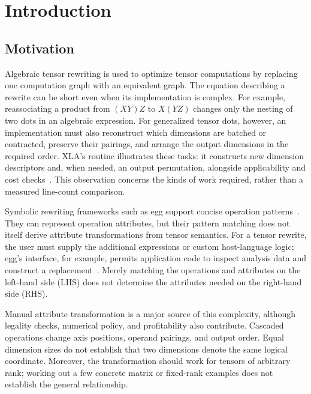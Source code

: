 \FloatBarrier
\section{Introduction}
\label{sec:introduction}
\FloatBarrier
\subsection{Motivation}
Algebraic tensor rewriting is used to optimize tensor computations by replacing
one computation graph with an equivalent graph. The equation describing a
rewrite can be short even when its implementation is complex. For example,
reassociating a product from $(XY)Z$ to $X(YZ)$ changes only the nesting of two
dots in an algebraic expression. For generalized tensor dots, however, an
implementation must also reconstruct which dimensions are batched or
contracted, preserve their pairings, and arrange the output dimensions in the
required order. XLA's  routine illustrates
these tasks: it constructs new dimension descriptors and, when needed, an
output permutation, alongside applicability and cost checks~\cite{xla-simplifier}.
This observation concerns the kinds of work required, rather than a measured
line-count comparison. 

Symbolic rewriting frameworks such as egg support concise operation
patterns~\cite{egg}. They can represent operation attributes, but their pattern
matching does not itself derive attribute transformations from tensor
semantics. For a tensor rewrite, the user must supply the additional
expressions or custom host-language logic; egg's  interface, for
example, permits application code to inspect analysis data and construct a
replacement~\cite{egg-applier}. Merely matching the operations and attributes
on the left-hand side (LHS) does not determine the attributes needed on the
right-hand side (RHS).

Manual attribute transformation is a major source of this complexity, although
legality checks, numerical policy, and profitability also contribute. Cascaded
operations change axis positions, operand pairings, and output order. Equal
dimension sizes do not establish that two dimensions denote the same logical
coordinate. Moreover, the transformation should work for tensors of arbitrary
rank; working out a few concrete matrix or fixed-rank examples does not
establish the general relationship.

